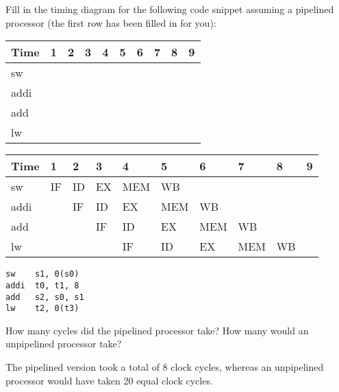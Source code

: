 \begin{blocksection}
\question Fill in the timing diagram for the following code snippet assuming a pipelined processor (the first row has been filled in for you):

\begin{tabular}{ |l|l|l|l|l|l|l|l|l|l| } 
 \hline
 Time & 1 & 2 & 3 & 4 & 5 & 6 & 7 & 8 & 9 \\
 \hline
 sw & & & & & & & & & \\
 \hline
 addi & & & & & & & & & \\
 \hline
 add & & & & & & & & & \\
 \hline
 lw & & & & & & & & & \\
 \hline
\end{tabular}

\begin{solution}
\begin{tabular}{ |l|l|l|l|l|l|l|l|l|l| } 
 \hline
 Time & 1 & 2 & 3 & 4 & 5 & 6 & 7 & 8 & 9 \\
 \hline
 sw & IF & ID & EX & MEM & WB & & & & \\
 \hline
 addi & & IF & ID & EX & MEM & WB & & & \\
 \hline
 add & & & IF & ID & EX & MEM & WB & & \\
 \hline
 lw & & & & IF & ID & EX & MEM & WB & \\
 \hline
\end{tabular}
\end{solution}

\begin{verbatim}
sw	  s1, 0(s0)
addi  t0, t1, 8
add   s2, s0, s1
lw	  t2, 0(t3)
\end{verbatim}

How many cycles did the pipelined processor take? How many would an unpipelined processor take?

\begin{solution}
The pipelined version took a total of 8 clock cycles, whereas an unpipelined processor would have taken 20 equal clock cycles.
\end{solution}
\end{blocksection}